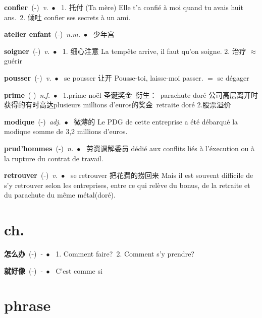 \documentclass[10pt,a4paper,twoside]{article} %
\newcommand{\entry}[4]{\textbf{#1}\ {(#2)}\ \textit{#3}\ $\bullet$\ {#4}} %
\begin{document}
\begin{CJK*}{UTF8}{gkai}
\begin{multicols}{2}
\entry{confier}{-}{v.}
{
1. 托付 (Ta mère) Elle t'a confié à moi quand tu avais huit ans.\ 
2. 倾吐 confier ses secrets à un ami.
}

\entry{atelier enfant}{-}{n.m.}
{
少年宫
}

\entry{soigner}{-}{v.}
{
1. 细心注意 La tempête arrive, il faut qu'on soigne.
2. 治疗 $\approx$ guérir
}

\entry{pousser}{-}{v.}
{
se pousser 让开 Pousse-toi, laisse-moi passer. $=$ se dégager
}

\entry{prime}{-}{n.f.}
{
1.prime noël 圣诞奖金\ 
衍生：\ 
parachute doré 公司高层离开时获得的有时高达plusieurs millions d'euros的奖金\ 
retraite doré
2.股票溢价
}

\entry{modique}{-}{adj.}
{
微薄的 Le PDG de cette entreprise a été débarqué la modique somme de 3,2 millions d'euros.
}

\entry{prud'hommes}{-}{n.}
{
劳资调解委员 dédié aux conflits liés à l'éxecution ou à la rupture du contrat de travail.
}

\entry{retrouver}{-}{v.}
{
se retrouver 把花费的捞回来 Mais il est souvent difficile de s'y retrouver selon les entreprises, entre 
ce qui relève du bonus, de la retraite et du parachute du même métal(doré).
}

\end{multicols}


\section*{ch.}

\begin{multicols}{2}

\entry{怎么办}{-}{-}
{
1. Comment faire?\ 
2. Comment s'y prendre?\ 
}

\entry{就好像}{-}{-}
{
C'est comme si 
}



\end{multicols}



\section*{phrase}


\end{CJK*}
\end{document}
